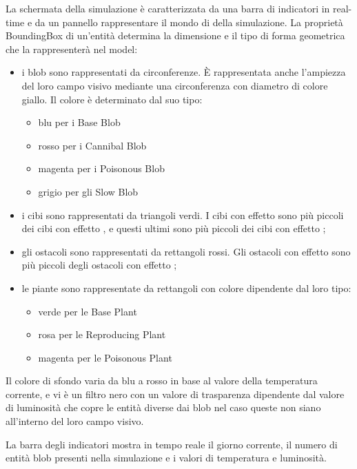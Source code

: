 La schermata della simulazione è caratterizzata da una barra di indicatori in real-time e da un pannello rappresentare il mondo di della simulazione. La proprietà BoundingBox di un'entità determina la dimensione e il tipo di forma geometrica che la rappresenterà nel model:

\begin{itemize}
	\item i blob sono rappresentati da circonferenze. È rappresentata anche l'ampiezza del loro campo visivo mediante una circonferenza con diametro di colore giallo. Il colore è determinato dal suo tipo:
	\begin{itemize}
		\item blu per i Base Blob
		\item rosso per i Cannibal Blob
		\item magenta per i Poisonous Blob
		\item grigio per gli Slow Blob
	\end{itemize}
	\item i cibi sono rappresentati da triangoli verdi. I cibi con effetto  sono più piccoli dei cibi con effetto , e questi ultimi sono più piccoli dei cibi con effetto ;
	\item gli ostacoli sono rappresentati da rettangoli rossi. Gli ostacoli con effetto  sono più piccoli degli ostacoli con effetto ;
	\item le piante sono rappresentate da rettangoli con colore dipendente dal loro tipo:
	\begin{itemize}
		\item verde per le Base Plant
		\item rosa per le Reproducing Plant
		\item magenta per le Poisonous Plant
	\end{itemize}
\end{itemize}

Il colore di sfondo varia da blu a rosso in base al valore della temperatura corrente, e vi è un filtro nero con un valore di trasparenza dipendente dal valore di luminosità che copre le entità diverse dai blob nel caso queste non siano all'interno del loro campo visivo.

La barra degli indicatori mostra in tempo reale il giorno corrente, il numero di entità blob presenti nella simulazione e i valori di temperatura e luminosità.

